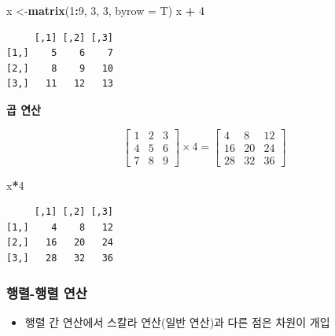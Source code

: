 \documentclass[
  11pt,
]{krantz}
\newenvironment{Shaded}{\begin{snugshade}}{\end{snugshade}}
\newcommand{\DataTypeTok}[1]{\textcolor[rgb]{0.27,0.27,0.27}{#1}}
\newcommand{\DecValTok}[1]{\textcolor[rgb]{0.06,0.06,0.06}{#1}}
\newcommand{\KeywordTok}[1]{\textcolor[rgb]{0.27,0.27,0.27}{\textbf{#1}}}
\newcommand{\NormalTok}[1]{#1}
\newcommand{\OperatorTok}[1]{\textcolor[rgb]{0.43,0.43,0.43}{\textbf{#1}}}
\newcommand{\StringTok}[1]{\textcolor[rgb]{0.5,0.5,0.5}{#1}}
\providecommand{\tightlist}{%
  \setlength{\itemsep}{0pt}\setlength{\parskip}{0pt}}
\begin{document}
\footnotesize

\begin{Shaded}
\begin{Highlighting}[]
\NormalTok{x <-}\KeywordTok{matrix}\NormalTok{(}\DecValTok{1}\OperatorTok{:}\DecValTok{9}\NormalTok{, }\DecValTok{3}\NormalTok{, }\DecValTok{3}\NormalTok{, }\DataTypeTok{byrow =}\NormalTok{ T)}
\NormalTok{x }\OperatorTok{+}\StringTok{ }\DecValTok{4}
\end{Highlighting}
\end{Shaded}

\begin{verbatim}
     [,1] [,2] [,3]
[1,]    5    6    7
[2,]    8    9   10
[3,]   11   12   13
\end{verbatim}

\normalsize

\textbf{곱 연산}

\[\begin{bmatrix}
1 & 2 & 3 \\
4 & 5 & 6 \\ 
7 & 8 & 9
\end{bmatrix} \times 4 = 
\begin{bmatrix}
4  &  8 & 12 \\
16 & 20 & 24 \\ 
28 & 32 & 36
\end{bmatrix} 
\]

\footnotesize

\begin{Shaded}
\begin{Highlighting}[]
\NormalTok{x}\OperatorTok{*}\DecValTok{4}
\end{Highlighting}
\end{Shaded}

\begin{verbatim}
     [,1] [,2] [,3]
[1,]    4    8   12
[2,]   16   20   24
[3,]   28   32   36
\end{verbatim}

\normalsize

\hypertarget{mat-op-m}{%
\subsubsection*{\texorpdfstring{\textbf{행렬-행렬 연산}}{행렬-행렬 연산}}\label{mat-op-m}}


\begin{itemize}
\tightlist
\item
  행렬 간 연산에서 스칼라 연산(일반 연산)과 다른 점은 차원이 개입
\end{itemize}
\end{document}
